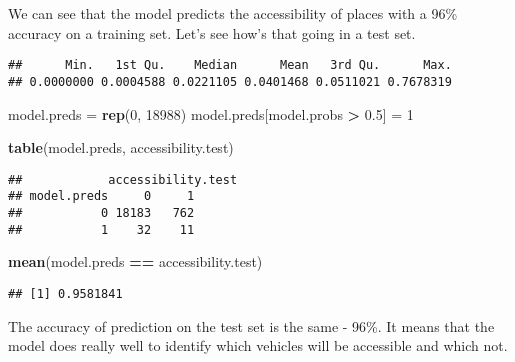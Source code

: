 \documentclass[
]{article}
\newenvironment{Shaded}{\begin{snugshade}}{\end{snugshade}}
\newcommand{\AttributeTok}[1]{\textcolor[rgb]{0.13,0.29,0.53}{#1}}
\newcommand{\DecValTok}[1]{\textcolor[rgb]{0.00,0.00,0.81}{#1}}
\newcommand{\FloatTok}[1]{\textcolor[rgb]{0.00,0.00,0.81}{#1}}
\newcommand{\FunctionTok}[1]{\textcolor[rgb]{0.13,0.29,0.53}{\textbf{#1}}}
\newcommand{\NormalTok}[1]{#1}
\newcommand{\OtherTok}[1]{\textcolor[rgb]{0.56,0.35,0.01}{#1}}
\newcommand{\SpecialCharTok}[1]{\textcolor[rgb]{0.81,0.36,0.00}{\textbf{#1}}}
\newcommand{\StringTok}[1]{\textcolor[rgb]{0.31,0.60,0.02}{#1}}
\begin{document}
We can see that the model predicts the accessibility of places with a
96\% accuracy on a training set. Let's see how's that going in a test
set.

\begin{Shaded}
\end{Shaded}

\begin{verbatim}
##      Min.   1st Qu.    Median      Mean   3rd Qu.      Max. 
## 0.0000000 0.0004588 0.0221105 0.0401468 0.0511021 0.7678319
\end{verbatim}

\begin{Shaded}
\begin{Highlighting}[]
\NormalTok{model.preds }\OtherTok{=} \FunctionTok{rep}\NormalTok{(}\DecValTok{0}\NormalTok{, }\DecValTok{18988}\NormalTok{)}
\NormalTok{model.preds[model.probs }\SpecialCharTok{\textgreater{}} \FloatTok{0.5}\NormalTok{] }\OtherTok{=} \DecValTok{1}

\FunctionTok{table}\NormalTok{(model.preds, accessibility.test)}
\end{Highlighting}
\end{Shaded}

\begin{verbatim}
##            accessibility.test
## model.preds     0     1
##           0 18183   762
##           1    32    11
\end{verbatim}

\begin{Shaded}
\begin{Highlighting}[]
\FunctionTok{mean}\NormalTok{(model.preds }\SpecialCharTok{==}\NormalTok{ accessibility.test)}
\end{Highlighting}
\end{Shaded}

\begin{verbatim}
## [1] 0.9581841
\end{verbatim}

The accuracy of prediction on the test set is the same - 96\%. It means
that the model does really well to identify which vehicles will be
accessible and which not.
\end{document}
